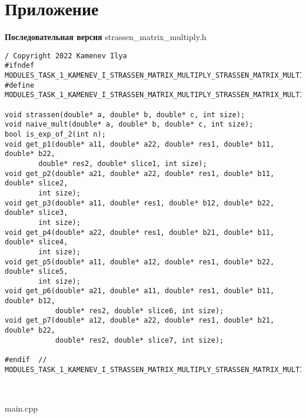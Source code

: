 \documentclass{report}
\begin{document}
\section*{Приложение}
\textbf{Последовательная версия}
\newline
\newline strassen\_matrix\_multiply.h
\begin{lstlisting}
/ Copyright 2022 Kamenev Ilya
#ifndef MODULES_TASK_1_KAMENEV_I_STRASSEN_MATRIX_MULTIPLY_STRASSEN_MATRIX_MULTIPLY_H_
#define MODULES_TASK_1_KAMENEV_I_STRASSEN_MATRIX_MULTIPLY_STRASSEN_MATRIX_MULTIPLY_H_

void strassen(double* a, double* b, double* c, int size);
void naive_mult(double* a, double* b, double* c, int size);
bool is_exp_of_2(int n);
void get_p1(double* a11, double* a22, double* res1, double* b11, double* b22,
        double* res2, double* slice1, int size);
void get_p2(double* a21, double* a22, double* res1, double* b11, double* slice2,
        int size);
void get_p3(double* a11, double* res1, double* b12, double* b22, double* slice3,
        int size);
void get_p4(double* a22, double* res1, double* b21, double* b11, double* slice4,
        int size);
void get_p5(double* a11, double* a12, double* res1, double* b22, double* slice5,
        int size);
void get_p6(double* a21, double* a11, double* res1, double* b11, double* b12,
            double* res2, double* slice6, int size);
void get_p7(double* a12, double* a22, double* res1, double* b21, double* b22,
            double* res2, double* slice7, int size);

#endif  // MODULES_TASK_1_KAMENEV_I_STRASSEN_MATRIX_MULTIPLY_STRASSEN_MATRIX_MULTIPLY_H_



\end{lstlisting}
main.cpp
\end{document}
